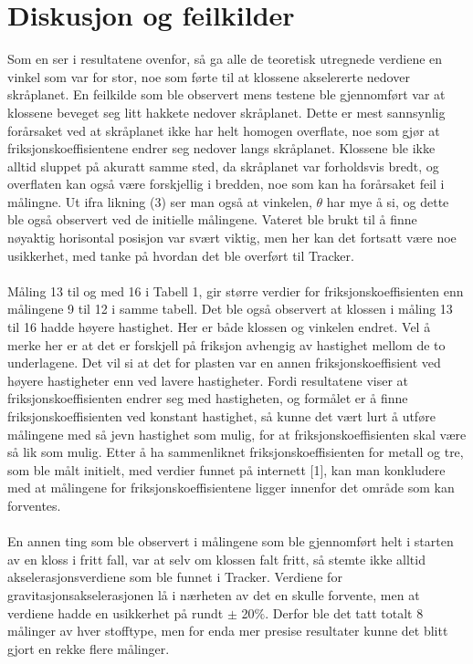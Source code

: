 \documentclass[10pt,a4paper]{report}
\begin{document}
\section*{Diskusjon og feilkilder}
Som en ser i resultatene ovenfor, så ga alle de teoretisk utregnede verdiene en vinkel som var for stor, noe som førte til at klossene akselererte nedover skråplanet. En feilkilde som ble observert mens testene ble gjennomført var at klossene beveget seg litt hakkete nedover skråplanet. Dette er mest sannsynlig forårsaket ved at skråplanet ikke har helt homogen overflate, noe som gjør at friksjonskoeffisientene endrer seg nedover langs skråplanet. Klossene ble ikke alltid sluppet på akuratt samme sted, da skråplanet var forholdsvis bredt, og overflaten kan også være forskjellig i bredden, noe som kan ha forårsaket feil i målingne. Ut ifra likning (3) ser man også at vinkelen, $\theta$ har mye å si, og dette ble også observert ved de initielle målingene. Vateret ble brukt til å finne nøyaktig horisontal posisjon var svært viktig, men her kan det fortsatt være noe usikkerhet, med tanke på hvordan det ble overført til Tracker.\\\\
Måling 13 til og med 16 i Tabell 1, gir større verdier for friksjonskoeffisienten enn målingene 9 til 12 i samme tabell. Det ble også observert at klossen i måling 13 til 16 hadde høyere hastighet. Her er både klossen og vinkelen endret. Vel å merke her er at det er forskjell på friksjon avhengig av hastighet mellom de to underlagene. Det vil si at det for plasten var en annen friksjonskoeffisient ved høyere hastigheter enn ved lavere hastigheter. Fordi resultatene viser at friksjonskoeffisienten endrer seg med hastigheten, og formålet er å finne friksjonskoeffisienten ved konstant hastighet, så kunne det vært lurt å utføre målingene med så jevn hastighet som mulig, for at friksjonskoeffisienten skal være så lik som mulig. Etter å ha sammenliknet friksjonskoeffisienten for metall og tre, som ble målt initielt, med verdier funnet på internett [1], kan man konkludere med at målingene for friksjonskoeffisientene ligger innenfor det område som kan forventes.\\\\
En annen ting som ble observert i målingene som ble gjennomført helt i starten av en kloss i fritt fall, var at selv om klossen falt fritt, så stemte ikke alltid akselerasjonsverdiene som ble funnet i Tracker. Verdiene for gravitasjonsakselerasjonen lå i nærheten av det en skulle forvente, men at verdiene hadde en usikkerhet på rundt $\pm$ 20$\%$. Derfor ble det tatt totalt 8 målinger av hver stofftype, men for enda mer presise resultater kunne det blitt gjort en rekke flere målinger.
\end{document}
